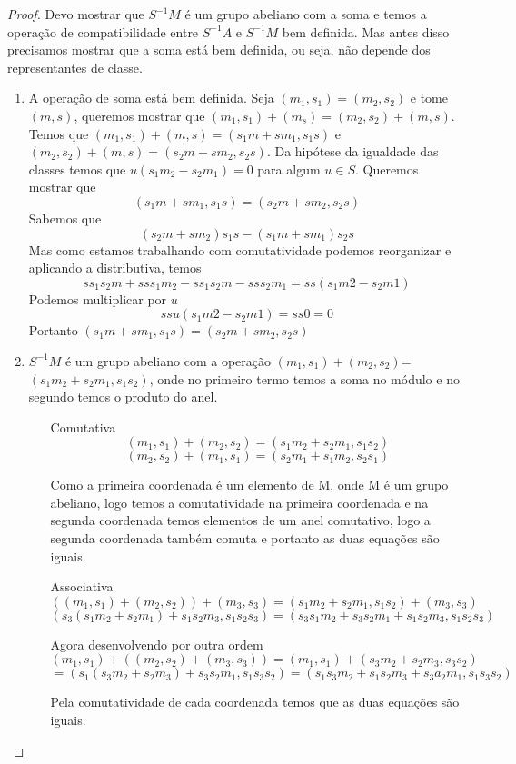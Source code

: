 \documentclass[10pt,a4paper]{article}
\begin{document}
\begin{proof}
	Devo mostrar que $S^{-1}M$ é um grupo abeliano com a soma e temos a operação de compatibilidade entre $S^{-1}A$ e $S^{-1}M$ bem definida. Mas antes disso precisamos mostrar que a soma está bem definida, ou seja, não depende dos representantes de classe.
	
	\begin{enumerate}
		\item A operação de soma está bem definida. Seja $(m_1,s_1)=(m_2,s_2)$ e tome $(m,s)$, queremos mostrar que $(m_1,s_1)+(m_s)=(m_2,s_2)+(m,s)$.
		Temos que $(m_1,s_1)+(m,s)=(s_1m+sm_1,s_1s)$ e $(m_2,s_2)+(m,s)=(s_2m+sm_2,s_2s)$. Da hipótese da igualdade das classes temos que $u(s_1m_2-s_2m_1)=0$ para algum $u \in S$.
		Queremos mostrar que
		$$(s_1m+sm_1,s_1s)=(s_2m+sm_2,s_2s)$$
		Sabemos que $$(s_2m+sm_2)s_1s-(s_1m+sm_1)s_2s$$
		Mas como estamos trabalhando com comutatividade podemos reorganizar e aplicando a distributiva, temos
		$$ss_1s_2m+sss_1m_2-ss_1s_2m-sss_2m_1=ss(s_1m2-s_2m1)$$
		Podemos multiplicar por $u$
		$$ssu(s_1m2-s_2m1)=ss0=0$$
		Portanto $(s_1m+sm_1,s_1s)=(s_2m+sm_2,s_2s)$
		
		\item $S^{-1}M$ é um grupo abeliano com a operação $(m_1,s_1)+(m_2,s_2)$=$(s_1m_2+s_2m_1,s_1s_2)$, onde no primeiro termo temos a soma no módulo e no segundo temos o produto do anel.
		
		\begin{enumerate}
			\item [Comutativa] $$(m_1,s_1)+(m_2,s_2) = (s_1m_2+s_2m_1,s_1s_2)$$
			$$(m_2,s_2)+(m_1,s_1) = (s_2m_1+s_1m_2,s_2s_1)$$
			
			Como a primeira coordenada é um elemento de M, onde M é um grupo abeliano, logo temos a comutatividade na primeira coordenada e na segunda coordenada temos elementos de um anel comutativo, logo a segunda coordenada também comuta e portanto as duas equações são iguais.
			
			\item [Associativa] $$((m_1,s_1)+(m_2,s_2))+(m_3,s_3)=(s_1m_2+s_2m_1,s_1s_2)+(m_3,s_3)$$
			$$(s_3(s_1m_2+s_2m_1)+s_1s_2m_3,s_1s_2s_3)=(s_3s_1m_2+s_3s_2m_1+s_1s_2m_3,s_1s_2s_3)$$
			
			Agora desenvolvendo por outra ordem
			$$(m_1,s_1)+((m_2,s_2)+(m_3,s_3))=(m_1,s_1)+(s_3m_2+s_2m_3,s_3s_2)$$
			$$=(s_1(s_3m_2+s_2m_3)+s_3s_2m_1,s_1s_3s_2)=(s_1s_3m_2+s_1s_2m_3+s_3a_2m_1, s_1s_3s_2)$$
			
			Pela comutatividade de cada coordenada temos que as duas equações são iguais.
			

\end{enumerate}
\end{enumerate}
\end{proof}
\end{document}

